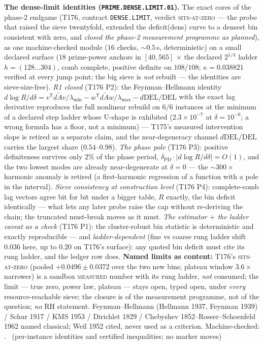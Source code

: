 \par\smallskip\noindent\textbf{The dense-limit identities
(\texttt{PRIME.DENSE.LIMIT.01}).}
The exact cores of the phase-2 endgame (T176, contract
\texttt{DENSE.LIMIT}, verdict \textsc{sits-at-zero} --- the probe that
raised the sieve twentyfold, extended the deficit(dens) curve to a
densest bin consistent with zero, and \emph{closed the phase-2
measurement programme as planned}), as one machine-checked module
($16$ checks, ${\sim}0.5$\,s, deterministic) on a small declared
surface ($18$ prime-power anchors in $[40,565]$ $\times$ the declared
$2^{1/4}$ ladder $h=(128\ldots304)$, comb complete, positive definite
on $108/108$; $\kappa=0.038821$ verified at every jump point; the big
sieve is \emph{not} rebuilt --- the identities are sieve-size-free).
\emph{R1 closed} (T176 P2): the Feynman--Hellmann identity
$d\log R/d\delta=v^{\mathsf T}d\tilde Av/\lambda_{\min}
-w^{\mathsf T}d\tilde Aw/\lambda_{\max}-d\mathrm{DEL}/\mathrm{DEL}$
with the exact lag derivative reproduces the full nonlinear rebuild on
$6/6$ instances at the minimum of a declared step ladder whose U-shape
is exhibited ($2.3\times10^{-7}$ at $\delta=10^{-6}$; a wrong formula
has a floor, not a minimum) --- T175's measured intervention slope is
retired as a separate claim, and the near-degeneracy channel
$d\mathrm{DEL}/\mathrm{DEL}$ carries the largest share
($0.54$--$0.98$).
\emph{The phase pole} (T176 P3): positive definiteness survives only
$2\%$ of the phase period, $\delta_{\mathrm{PD}}\cdot|d\log
R/d\delta|=O(1)$, and the two lowest modes are already near-degenerate
at $\delta=0$ --- the ${\sim}300\times$ harmonic anomaly is retired (a
first-harmonic regression of a function with a pole in the interval).
\emph{Sieve consistency at construction level} (T176 P4): complete-comb
lag vectors agree bit for bit under a bigger table, $R$ exactly, the
bin deficit identically --- what lets any later probe raise the cap
without re-deriving the chain; the truncated must-break moves as it
must.
\emph{The estimator $+$ the ladder caveat as a check} (T176 P1): the
cluster-robust bin statistic is deterministic and exactly reproducible
--- and \emph{ladder-dependent} (fine vs coarse rung ladder shift
$0.036$ here, up to $0.20$ on T176's surface): any quoted bin deficit
must cite its rung ladder, and the ledger row does.
\textbf{Named limits as content:} T176's \textsc{sits-at-zero} (pooled
$+0.0496\pm0.0372$ over the two new bins; plateau window $3.6\times$
narrower) is a sandbox \textsc{measured} number with its rung ladder,
\emph{not} consumed; the limit --- true zero, power law, plateau ---
stays open, typed open, under \emph{every} resource-reachable sieve;
the closure is of the measurement programme, not of the question;
\emph{no} RH statement.
Feynman--Hellmann (Hellmann 1937, Feynman 1939) / Schur 1917 / KMS
1953 / Dirichlet 1829 / Chebyshev 1852--Rosser--Schoenfeld 1962 named
classical; Weil 1952 cited, never used as a criterion.
Machine-checked:
.
\mE\ (per-instance identities and certified inequalities; no marker moves)



